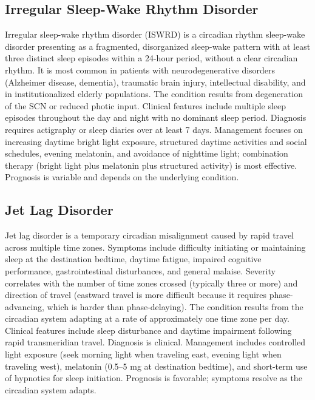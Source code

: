 \subsection{Irregular Sleep-Wake Rhythm Disorder}
\label{sec:Irregular Sleep-Wake Rhythm Disorder}
Irregular sleep-wake rhythm disorder (ISWRD) is a circadian rhythm sleep-wake disorder presenting as a fragmented, disorganized sleep-wake pattern with at least three distinct sleep episodes within a 24-hour period, without a clear circadian rhythm. It is most common in patients with neurodegenerative disorders (Alzheimer disease, dementia), traumatic brain injury, intellectual disability, and in institutionalized elderly populations. The condition results from degeneration of the SCN or reduced photic input. Clinical features include multiple sleep episodes throughout the day and night with no dominant sleep period. Diagnosis requires actigraphy or sleep diaries over at least 7 days. Management focuses on increasing daytime bright light exposure, structured daytime activities and social schedules, evening melatonin, and avoidance of nighttime light; combination therapy (bright light plus melatonin plus structured activity) is most effective. Prognosis is variable and depends on the underlying condition.

\subsection{Jet Lag Disorder}
\label{sec:Jet Lag Disorder}
Jet lag disorder is a temporary circadian misalignment caused by rapid travel across multiple time zones. Symptoms include difficulty initiating or maintaining sleep at the destination bedtime, daytime fatigue, impaired cognitive performance, gastrointestinal disturbances, and general malaise. Severity correlates with the number of time zones crossed (typically three or more) and direction of travel (eastward travel is more difficult because it requires phase-advancing, which is harder than phase-delaying). The condition results from the circadian system adapting at a rate of approximately one time zone per day. Clinical features include sleep disturbance and daytime impairment following rapid transmeridian travel. Diagnosis is clinical. Management includes controlled light exposure (seek morning light when traveling east, evening light when traveling west), melatonin (0.5--5 mg at destination bedtime), and short-term use of hypnotics for sleep initiation. Prognosis is favorable; symptoms resolve as the circadian system adapts.

